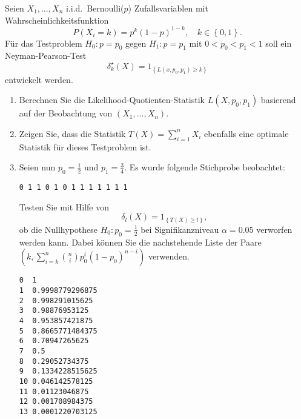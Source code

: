  Seien $X_1,\ldots,X_n$ 
i.i.d.\ Bernoulli($p$) Zufallsvariablen mit Wahrscheinlichkeitsfunktion
\begin{equation*}
    P(X_i = k) = p^{k} \left( 1-p \right)^{1-k}, \quad k\in\left\{ 0,1 \right\}.
\end{equation*}
Für das Testproblem $H_0 : p=p_0$ gegen $H_1 : p=p_1$ mit $0<p_0<p_1<1$ 
soll ein Neyman-Pearson-Test
\begin{equation*}
    \delta_k^\star (X) = 1_{ \left\{ L(x,p_0,p_1)\geq k \right\}  }
\end{equation*}
entwickelt werden.
\begin{enumerate}
    \item Berechnen Sie die Likelihood-Quotienten-Statistik $L(X,p_0,p_1)$ basierend auf der
        Beobachtung von $\left( X_1,\ldots,X_n \right)$.
    \item Zeigen Sie, dass die Statistik $T(X)= \sum_{i=1}^{n} X_i$ ebenfalls eine
        optimale Statistik für dieses Testproblem ist.
    \item Seien nun $p_0=\frac{1}{2}$ und $p_1=\frac{3}{4}$. Es wurde folgende Stichprobe beobachtet:
        \begin{lstlisting}
0 1 1 0 1 0 1 1 1 1 1 1 1
        \end{lstlisting}
        Testen Sie mit Hilfe von 
        \begin{equation*}
            \delta_l(X) = 1_{   \left\{ T(X) \geq l \right\}},
        \end{equation*}
        ob die Nullhypothese $H_0 : p_0=\frac{1}{2}$ bei Signifikanzniveau $\alpha=0.05$
        verworfen werden kann. Dabei können Sie die nachstehende Liste der Paare 
        $\left( k, \sum_{i=k}^{n} \binom{n}{i} p_0^i \left( 1-p_0 \right)^{n-i} \right)$ verwenden.
        \begin{lstlisting}
0  1
1  0.9998779296875
2  0.998291015625
3  0.98876953125
4  0.953857421875
5  0.8665771484375
6  0.70947265625
7  0.5
8  0.29052734375
9  0.1334228515625
10 0.046142578125
11 0.01123046875
12 0.001708984375
13 0.0001220703125
\end{lstlisting}            

\end{enumerate}


